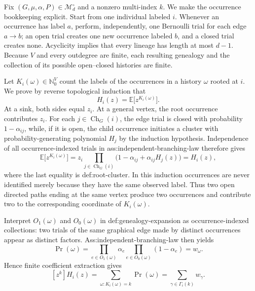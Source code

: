 Fix \((G,\mu,\alpha,P)\in\mathcal M_d^\circ\) and a nonzero multi-index \(k\).  We make the occurrence bookkeeping explicit.  Start from one individual labeled \(i\).  Whenever an occurrence has label \(a\), perform, independently, one Bernoulli trial for each edge \(a\to b\); an open trial creates one new occurrence labeled \(b\), and a closed trial creates none.  Acyclicity implies that every lineage has length at most \(d-1\).  Because \(V\) and every outdegree are finite, each resulting genealogy and the collection of its possible open--closed histories are finite.

Let \(K_i(\omega)\in\mathbb N_0^V\) count the labels of the occurrences in a history \(\omega\) rooted at \(i\).  We prove by reverse topological induction that
\[
 H_i(z)=\mathbb E\bigl[z^{K_i(\omega)}\bigr].
\]
At a sink, both sides equal \(z_i\).  At a general vertex, the root occurrence contributes \(z_i\).  For each \(j\in\operatorname{Ch}_G(i)\), the edge trial is closed with probability \(1-\alpha_{ij}\), while, if it is open, the child occurrence initiates a cluster with probability-generating polynomial \(H_j\) by the induction hypothesis.  Independence of all occurrence-indexed trials in ass:independent-branching-law therefore gives
\[
 \mathbb E\bigl[z^{K_i(\omega)}\bigr]
 =z_i\prod_{j\in\operatorname{Ch}_G(i)}
       \bigl(1-\alpha_{ij}+\alpha_{ij}H_j(z)\bigr)
 =H_i(z),
\]
where the last equality is def:root-cluster.  In this induction occurrences are never identified merely because they have the same observed label.  Thus two open directed paths ending at the same vertex produce two occurrences and contribute two to the corresponding coordinate of \(K_i(\omega)\).

Interpret \(O_1(\omega)\) and \(O_0(\omega)\) in def:genealogy-expansion as occurrence-indexed collections: two trials of the same graphical edge made by distinct occurrences appear as distinct factors.  Ass:independent-branching-law then yields
\[
 \Pr(\omega)
 =\prod_{e\in O_1(\omega)}\alpha_e
   \prod_{e\in O_0(\omega)}(1-\alpha_e)
 =w_\omega.
\]
Hence finite coefficient extraction gives
\[
 [z^k]H_i(z)
 =\sum_{\omega:K_i(\omega)=k}\Pr(\omega)
 =\sum_{\gamma\in\Gamma_i(k)}w_\gamma.
\tag{1}
\]


